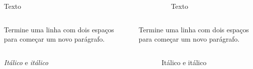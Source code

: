 \documentclass[
]{book}
\begin{document}
\begin{columns}

\begin{column}

Texto

\end{column}

\begin{column}

~

\end{column}

\begin{column}

Texto

\end{column}

\end{columns}

\begin{columns}

\begin{column}

Termine uma linha com dois espaços para
começar um novo parágrafo.

\end{column}

\begin{column}

~

\end{column}

\begin{column}

Termine uma linha com dois espaços para começar um novo parágrafo.

\end{column}

\end{columns}

\begin{columns}

\begin{column}

\emph{Itálico} e \emph{itálico}

\end{column}

\begin{column}

~

\end{column}

\begin{column}

Itálico e itálico

\end{column}

\end{columns}
\end{document}
